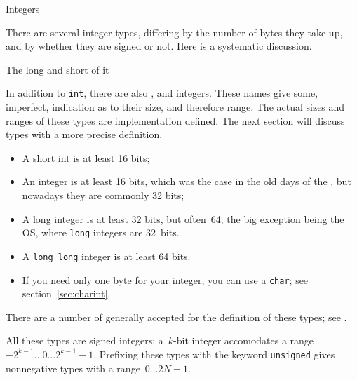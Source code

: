 
 {Integers}
\label{sec:more-ints}

There are several integer types,
differing by the number of bytes they take up,
and by whether they are signed or not.
Here is a systematic discussion.

 {The long and short of it}
\label{sec:shortintlong}

In addition to \lstinline{int},
there are also , 
and  integers.
These names give some, imperfect, indication
as to their size, and therefore range.
The actual sizes and ranges of these types are implementation defined.
The next section will discuss types with a more precise definition.

\begin{itemize}
\item A short int is at least 16 bits;
\item An integer is at least 16 bits, which was the case
  in the old days of the ,
  but nowadays they are commonly 32 bits;
\item A long integer is at least 32 bits, but often~64;
  the big exception being the  \acs{OS},
  where \lstinline{long} integers are 32~bits.
\item A \lstinline{long long} integer is at least 64 bits.
\item If you need only one byte for your integer, you can use a \lstinline{char};
  see section~\ref{sec:charint}.
\end{itemize}

\begin{nopackt}
  There are a number of generally accepted 
  for the definition of these types; see .
\end{nopackt}

All these types are signed integers:
a~$k$-bit integer accomodates a range $-2^{k-1}\ldots 0\ldots 2^{k-1}-1$.
Prefixing these types with the keyword \lstinline{unsigned}
gives nonnegative types with a range~$0\ldots 2N-1$.

